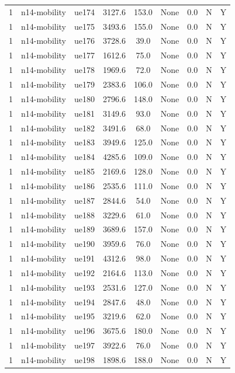 \begin{table}[ht]
\begin{tabular}{|c|c|c|c|c|c|c|c|c|}
1 & n14-mobility & ue174 & 3127.6 & 153.0 & None & 0.0 & N & Y \\
1 & n14-mobility & ue175 & 3493.6 & 155.0 & None & 0.0 & N & Y \\
1 & n14-mobility & ue176 & 3728.6 & 39.0 & None & 0.0 & N & Y \\
1 & n14-mobility & ue177 & 1612.6 & 75.0 & None & 0.0 & N & Y \\
1 & n14-mobility & ue178 & 1969.6 & 72.0 & None & 0.0 & N & Y \\
1 & n14-mobility & ue179 & 2383.6 & 106.0 & None & 0.0 & N & Y \\
1 & n14-mobility & ue180 & 2796.6 & 148.0 & None & 0.0 & N & Y \\
1 & n14-mobility & ue181 & 3149.6 & 93.0 & None & 0.0 & N & Y \\
1 & n14-mobility & ue182 & 3491.6 & 68.0 & None & 0.0 & N & Y \\
1 & n14-mobility & ue183 & 3949.6 & 125.0 & None & 0.0 & N & Y \\
1 & n14-mobility & ue184 & 4285.6 & 109.0 & None & 0.0 & N & Y \\
1 & n14-mobility & ue185 & 2169.6 & 128.0 & None & 0.0 & N & Y \\
1 & n14-mobility & ue186 & 2535.6 & 111.0 & None & 0.0 & N & Y \\
1 & n14-mobility & ue187 & 2844.6 & 54.0 & None & 0.0 & N & Y \\
1 & n14-mobility & ue188 & 3229.6 & 61.0 & None & 0.0 & N & Y \\
1 & n14-mobility & ue189 & 3689.6 & 157.0 & None & 0.0 & N & Y \\
1 & n14-mobility & ue190 & 3959.6 & 76.0 & None & 0.0 & N & Y \\
1 & n14-mobility & ue191 & 4312.6 & 98.0 & None & 0.0 & N & Y \\
1 & n14-mobility & ue192 & 2164.6 & 113.0 & None & 0.0 & N & Y \\
1 & n14-mobility & ue193 & 2531.6 & 127.0 & None & 0.0 & N & Y \\
1 & n14-mobility & ue194 & 2847.6 & 48.0 & None & 0.0 & N & Y \\
1 & n14-mobility & ue195 & 3219.6 & 62.0 & None & 0.0 & N & Y \\
1 & n14-mobility & ue196 & 3675.6 & 180.0 & None & 0.0 & N & Y \\
1 & n14-mobility & ue197 & 3922.6 & 76.0 & None & 0.0 & N & Y \\
1 & n14-mobility & ue198 & 1898.6 & 188.0 & None & 0.0 & N & Y \\

\end{tabular}
\end{table}

